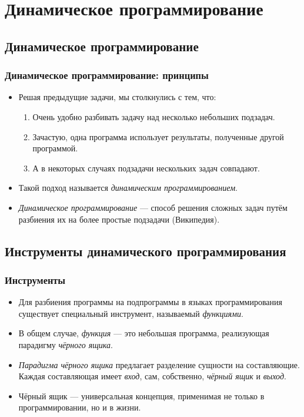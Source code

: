 \documentclass[compress,red]{beamer}
\begin{document}
\section{Динамическое программирование}
\subsection{Динамическое программирование}
\begin{frame}[fragile]
\frametitle{Динамическое программирование: принципы}
	\begin{itemize}
	  \item Решая предыдущие задачи, мы столкнулись с тем, что:
	    \begin{enumerate}
	      \item Очень удобно разбивать задачу над несколько небольших подзадач.
	      \item Зачастую, одна программа использует результаты, полученные другой программой.
	      \item А в некоторых случаях подзадачи нескольких задач совпадают.
	    \end{enumerate}
	  \item Такой подход называется \emph{динамическим программированием}.
	  \item \emph{Динамическое программирование} --- способ решения сложных задач путём разбиения их на более простые подзадачи (Википедия).
  \end{itemize}
\end{frame}

\subsection{Инструменты динамического программирования}
\begin{frame}[fragile]
\frametitle{Инструменты}
		\begin{itemize}
		\item Для разбиения программы на подпрограммы в языках программирования существует специальный инструмент, называемый \emph{функциями}.
		\item В общем случае, \emph{функция} --- это небольшая программа, реализующая парадигму \emph{чёрного ящика}.
		\item \emph{Парадигма чёрного ящика} предлагает разделение сущности на составляющие. Каждая составляющая имеет \emph{вход}, сам, собственно, \emph{чёрный ящик} и \emph{выход}.
		\item Чёрный ящик --- универсальная концепция, применимая не только в программировании, но и в жизни.
		\end{itemize}
\end{frame}
\end{document}
